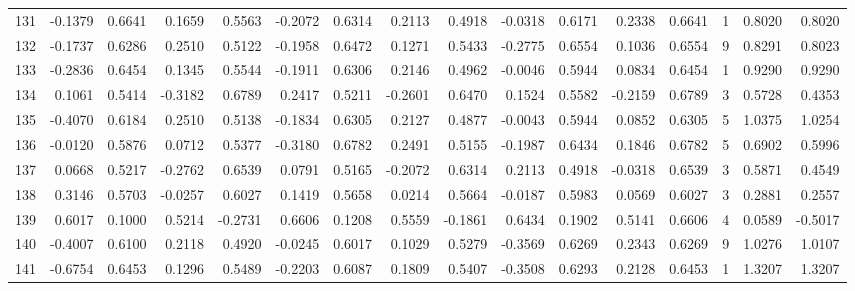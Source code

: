 \begin{tabular}{lrrrrrrrrrrrrrrr}
131 &     -0.1379 &  0.6641 &  0.1659 &  0.5563 & -0.2072 &  0.6314 &  0.2113 &  0.4918 & -0.0318 &  0.6171 &   0.2338 &     0.6641 &      1 &                    0.8020 &                     0.8020 \\
132 &     -0.1737 &  0.6286 &  0.2510 &  0.5122 & -0.1958 &  0.6472 &  0.1271 &  0.5433 & -0.2775 &  0.6554 &   0.1036 &     0.6554 &      9 &                    0.8291 &                     0.8023 \\
133 &     -0.2836 &  0.6454 &  0.1345 &  0.5544 & -0.1911 &  0.6306 &  0.2146 &  0.4962 & -0.0046 &  0.5944 &   0.0834 &     0.6454 &      1 &                    0.9290 &                     0.9290 \\
134 &      0.1061 &  0.5414 & -0.3182 &  0.6789 &  0.2417 &  0.5211 & -0.2601 &  0.6470 &  0.1524 &  0.5582 &  -0.2159 &     0.6789 &      3 &                    0.5728 &                     0.4353 \\
135 &     -0.4070 &  0.6184 &  0.2510 &  0.5138 & -0.1834 &  0.6305 &  0.2127 &  0.4877 & -0.0043 &  0.5944 &   0.0852 &     0.6305 &      5 &                    1.0375 &                     1.0254 \\
136 &     -0.0120 &  0.5876 &  0.0712 &  0.5377 & -0.3180 &  0.6782 &  0.2491 &  0.5155 & -0.1987 &  0.6434 &   0.1846 &     0.6782 &      5 &                    0.6902 &                     0.5996 \\
137 &      0.0668 &  0.5217 & -0.2762 &  0.6539 &  0.0791 &  0.5165 & -0.2072 &  0.6314 &  0.2113 &  0.4918 &  -0.0318 &     0.6539 &      3 &                    0.5871 &                     0.4549 \\
138 &      0.3146 &  0.5703 & -0.0257 &  0.6027 &  0.1419 &  0.5658 &  0.0214 &  0.5664 & -0.0187 &  0.5983 &   0.0569 &     0.6027 &      3 &                    0.2881 &                     0.2557 \\
139 &      0.6017 &  0.1000 &  0.5214 & -0.2731 &  0.6606 &  0.1208 &  0.5559 & -0.1861 &  0.6434 &  0.1902 &   0.5141 &     0.6606 &      4 &                    0.0589 &                    -0.5017 \\
140 &     -0.4007 &  0.6100 &  0.2118 &  0.4920 & -0.0245 &  0.6017 &  0.1029 &  0.5279 & -0.3569 &  0.6269 &   0.2343 &     0.6269 &      9 &                    1.0276 &                     1.0107 \\
141 &     -0.6754 &  0.6453 &  0.1296 &  0.5489 & -0.2203 &  0.6087 &  0.1809 &  0.5407 & -0.3508 &  0.6293 &   0.2128 &     0.6453 &      1 &                    1.3207 &                     1.3207 \\

\end{tabular}
